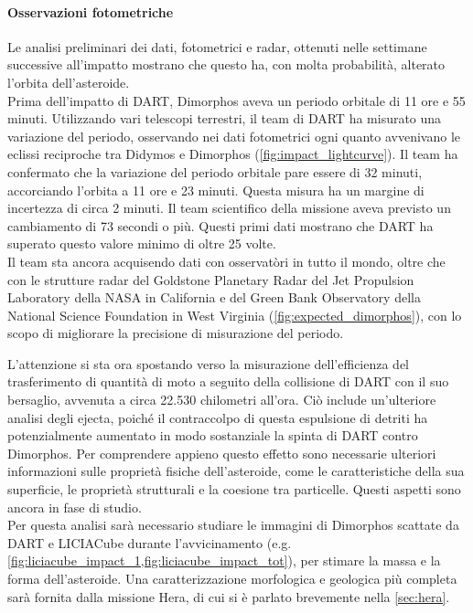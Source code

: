 \paragraph*{Osservazioni fotometriche}
Le analisi preliminari dei dati, fotometrici e radar, ottenuti nelle settimane successive all'impatto mostrano che questo ha, con molta probabilità, alterato l'orbita dell'asteroide.\\
Prima dell'impatto di DART, Dimorphos aveva un periodo orbitale di 11 ore e 55 minuti. Utilizzando vari telescopi terrestri, il team di DART ha misurato una variazione del periodo, osservando nei dati fotometrici ogni quanto avvenivano le eclissi reciproche tra Didymos e Dimorphos (\cref{fig:impact_lightcurve}). Il team ha confermato che la variazione del periodo orbitale pare essere di 32 minuti, accorciando l'orbita a 11 ore e 23 minuti. Questa misura ha un margine di incertezza di circa 2 minuti. 
Il team scientifico della missione aveva previsto un cambiamento di 73 secondi o più. Questi primi dati mostrano che DART ha superato questo valore minimo di oltre 25 volte. \\

Il team sta ancora acquisendo dati con osservatòri in tutto il mondo, oltre che con le strutture radar del Goldstone Planetary Radar del Jet Propulsion Laboratory della NASA in California e del Green Bank Observatory della National Science Foundation in West Virginia (\cref{fig:expected_dimorphos}), con lo scopo di migliorare la precisione di misurazione del periodo.

L'attenzione si sta ora spostando verso la misurazione dell'efficienza del trasferimento di quantità di moto a seguito della collisione di DART con il suo bersaglio, avvenuta a circa 22.530 chilometri all'ora. Ciò include un'ulteriore analisi degli ejecta, poiché il contraccolpo di questa espulsione di detriti ha potenzialmente aumentato in modo sostanziale la spinta di DART contro Dimorphos. %
Per comprendere appieno questo effetto sono necessarie ulteriori informazioni sulle proprietà fisiche dell'asteroide, come le caratteristiche della sua superficie, le proprietà strutturali e la coesione tra particelle. Questi aspetti sono ancora in fase di studio.\\
Per questa analisi sarà necessario studiare le immagini di Dimorphos scattate da DART e LICIACube durante l'avvicinamento (e.g. \cref{fig:liciacube_impact_1,fig:liciacube_impact_tot}), per stimare la massa e la forma dell'asteroide. Una caratterizzazione morfologica e geologica più completa sarà fornita dalla missione Hera, di cui si è parlato brevemente nella \cref{sec:hera}.

